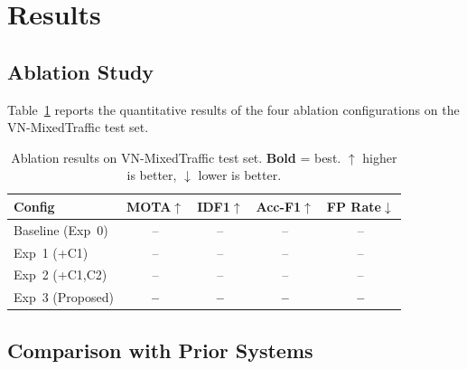
\section{Results}
\label{sec:results}

\subsection{Ablation Study}
\label{subsec:ablation_results}

Table~\ref{tab:ablation_results} reports the quantitative results
of the four ablation configurations on the VN-MixedTraffic test set.

\begin{table}[h]
  \centering
  \caption{Ablation results on VN-MixedTraffic test set.
           \textbf{Bold} = best. $\uparrow$ higher is better,
           $\downarrow$ lower is better.}
  \label{tab:ablation_results}
  \begin{tabular}{lcccc}
    \toprule
    Config & MOTA$\uparrow$ & IDF1$\uparrow$ & Acc-F1$\uparrow$ & FP Rate$\downarrow$ \\
    \midrule
    Baseline (Exp~0) & -- & -- & -- & -- \\
    Exp~1 (+C1)      & -- & -- & -- & -- \\
    Exp~2 (+C1,C2)   & -- & -- & -- & -- \\
    Exp~3 (Proposed) & \textbf{--} & \textbf{--} & \textbf{--} & \textbf{--} \\
    \bottomrule
  \end{tabular}
\end{table}



\subsection{Comparison with Prior Systems}
\label{subsec:comparison}

